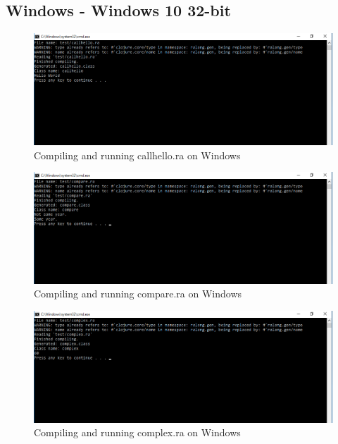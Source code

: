 \documentclass[a4paper]{article}
\begin{document}
\begin{appendices}
	\subsection{Windows - Windows 10 32-bit}
	\begin{figure}[h!]
		\centering
		\includegraphics[width=\linewidth]{images/windows_callhello.png}
		\caption[Compiling and running callhello.ra on Windows 10 32-bit]{Compiling and running callhello.ra on Windows}
		\label{fig:windows_callhello}
	\end{figure}
	\begin{figure}[h!]
		\centering
		\includegraphics[width=\linewidth]{images/windows_compare.png}
		\caption[Compiling and running compare.ra on Windows 10 32-bit]{Compiling and running compare.ra on Windows}
		\label{fig:windows_compare}
	\end{figure}
	\begin{figure}[h!]
		\centering
		\includegraphics[width=\linewidth]{images/windows_complex.png}
		\caption[Compiling and running complex.ra on Windows 10 32-bit]{Compiling and running complex.ra on Windows}

\end{figure}
\end{appendices}
\end{document}
